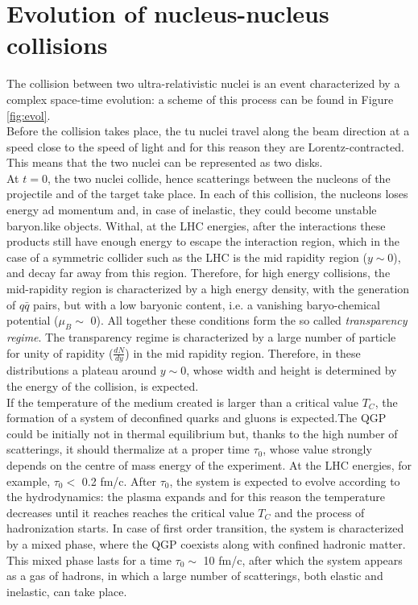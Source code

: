 \section{Evolution of nucleus-nucleus collisions}
The collision between two ultra-relativistic nuclei is an event characterized by a complex space-time evolution: a scheme of this process can be found in Figure \ref{fig:evol}.\\
Before the collision takes place, the tu nuclei travel along the beam direction at a speed close to the speed of light and for this reason they are Lorentz-contracted. This means that the two nuclei can be represented as two disks.\\
At $t=0$, the two nuclei collide, hence scatterings between the nucleons of the projectile and of the target take place. In each of this collision, the nucleons loses energy ad momentum and, in case of inelastic, they could become unstable baryon.like objects. Withal, at the LHC energies, after the interactions these products still have enough energy to escape the interaction region, which in the case of a symmetric collider such as the LHC is the mid rapidity region ($y\sim0$), and decay far away from this region. Therefore, for high energy collisions, the mid-rapidity region is characterized by a high energy density, with the generation of $q\bar{q}$ pairs, but with a low baryonic content, i.e. a vanishing baryo-chemical potential ($\mu_{B}\sim$ 0). All together these conditions form the so called \textit{transparency regime}. The transparency regime is characterized by a large number of particle for unity of rapidity ($\frac{dN}{dy}$) in the mid rapidity region. Therefore, in these distributions a plateau around $y\sim0$, whose width and height is determined by the energy of the collision, is expected.\\
If the temperature of the medium created is larger than a critical value $T_{C}$, the formation of a system of deconfined quarks and gluons is expected.The QGP could be initially not in thermal equilibrium but, thanks to the high number of scatterings, it should thermalize at a proper time $\tau_{0}$, whose value strongly depends on the centre of mass energy of the experiment. At the LHC energies, for example, $\tau_{0}<$ 0.2 fm/c. After $\tau_{0}$, the system is expected to evolve according to the hydrodynamics: the plasma expands and for this reason the temperature decreases until it reaches reaches the critical value $T_{C}$ and the process of hadronization starts. In case of first order transition, the system is characterized by a mixed phase, where the QGP coexists along with confined hadronic matter. This mixed phase lasts for a time $\tau_{0}\sim$ 10 fm/c, after which the system appears as a gas of hadrons, in which a large number of scatterings, both elastic and inelastic, can take place.
